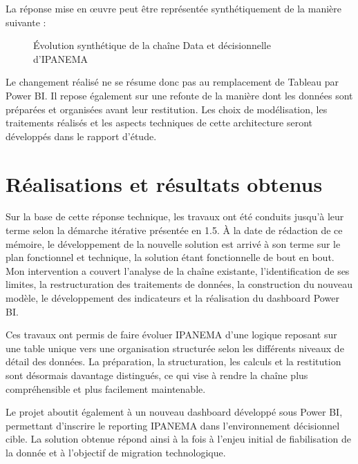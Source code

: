 La réponse mise en œuvre peut être représentée synthétiquement de la manière 
suivante :

\begin{figure}[!ht]
\centering
{}
\caption{Évolution synthétique de la chaîne Data et décisionnelle d'IPANEMA}
\label{fig:evolution-architecture-ipanema}
\end{figure}

Le changement réalisé ne se résume donc pas au remplacement de Tableau par Power 
BI. Il repose également sur une refonte de la manière dont les données sont préparées et 
organisées avant leur restitution. Les choix de modélisation, les traitements réalisés et les 
aspects techniques de cette architecture seront développés dans le rapport d'étude.

\section{Réalisations et résultats obtenus}

Sur la base de cette réponse technique, les travaux ont été conduits jusqu'à leur terme 
selon la démarche itérative présentée en 1.5. À la date de rédaction de ce mémoire, le 
développement de la nouvelle solution est arrivé à son terme sur le plan fonctionnel et 
technique, la solution étant fonctionnelle de bout en bout. Mon intervention a couvert l'analyse 
de la chaîne existante, l'identification de ses limites, la restructuration des traitements de 
données, la construction du nouveau modèle, le développement des indicateurs et la 
réalisation du dashboard Power BI.

Ces travaux ont permis de faire évoluer IPANEMA d'une logique reposant sur une table 
unique vers une organisation structurée selon les différents niveaux de détail des données. La 
préparation, la structuration, les calculs et la restitution sont désormais davantage distingués, 
ce qui vise à rendre la chaîne plus compréhensible et plus facilement maintenable.

Le projet aboutit également à un nouveau dashboard développé sous Power BI, permettant d'inscrire le reporting IPANEMA dans l'environnement décisionnel cible. La solution 
obtenue répond ainsi à la fois à l'enjeu initial de fiabilisation de la donnée et à l'objectif de 
migration technologique.

